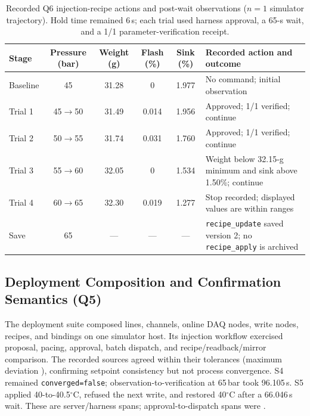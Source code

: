 \begin{table}[!t]
\centering
\caption{Recorded Q6 injection-recipe actions and post-wait observations
($n=1$ simulator trajectory). Hold time remained 6\,s; each trial used
harness approval, a 65-s wait, and a 1/1 parameter-verification receipt.}
\label{tab:q6actions}
\footnotesize
\setlength{\tabcolsep}{3.5pt}
\begin{tabularx}{\textwidth}{@{}l c c c c X@{}}
\toprule
Stage & Pressure (bar) & Weight (g) & Flash (\%) & Sink (\%) & Recorded action and outcome \\
\midrule
Baseline & 45 & 31.28 & 0 & 1.977 & No command; initial observation \\
Trial 1 & 45$\rightarrow$50 & 31.49 & 0.014 & 1.956 & Approved; 1/1 verified; continue \\
Trial 2 & 50$\rightarrow$55 & 31.74 & 0.031 & 1.760 & Approved; 1/1 verified; continue \\
Trial 3 & 55$\rightarrow$60 & 32.05 & 0 & 1.534 & Weight below 32.15-g minimum and sink above 1.50\%; continue \\
Trial 4 & 60$\rightarrow$65 & 32.30 & 0.019 & 1.277 & Stop recorded; displayed values are within ranges \\
Save & 65 & --- & --- & --- & \texttt{recipe\_update} saved version 2; no \texttt{recipe\_apply} is archived \\
\bottomrule
\end{tabularx}
\end{table}

\subsection{Deployment Composition and Confirmation Semantics (Q5)}
\label{sec:hardening}
The deployment suite composed \resLinesLive{} lines, \resChannelsLive{}
channels, \resDaqOnline{} online DAQ nodes, \resWriteNodesLive{} write nodes,
\resRecipesLive{} recipes, and \resBindingsLive{} bindings on one simulator
host. Its injection workflow exercised proposal, pacing, approval, batch
dispatch, and recipe/readback/mirror comparison. The recorded sources agreed
within their tolerances (maximum deviation \resConsistencyErr{}), confirming
setpoint consistency but not process convergence. S4 remained
\texttt{converged=false}; observation-to-verification at 65\,bar took
96.105\,s. S5 applied 40-to-40.5$^{\circ}$C, refused the next write, and
restored 40$^{\circ}$C after a 66.046\,s wait. These are server/harness spans; approval-to-dispatch spans
were \resHitlDispatchMs{}.

